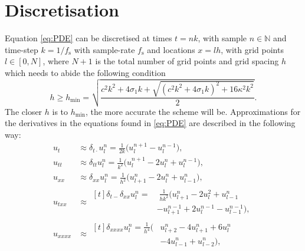 \documentclass[twoside,a4paper]{article}
\begin{document}
\section{Discretisation}\label{sec:discretisation}
Equation \eqref{eq:PDE} can be discretised at times $t = nk$, with sample $n \in \mathbb{N}$ and time-step $k = 1 / f_\text{s}$ with sample-rate $f_\text{s}$ and locations $x = lh$, with grid points $l \in [0,N]$, where $N + 1$ is the total number of grid points and grid spacing $h$ which needs to abide the following condition 
\begin{equation}
    h \geq h_\text{min} = \sqrt{\frac{c^2k^2+4 \sigma_1k+\sqrt{(c^2k^2+4\sigma_1k)^2+16\kappa^2k^2}}{2}}.
\end{equation}
The closer $h$ is to $h_\text{min}$, the more accurate the scheme will be. 
Approximations for the derivatives in the equations found in \ref{eq:PDE} are described in the following way: 
\begin{subequations}\label{eq:approximations}
    \begin{align}
        \label{eq:centerTime}
        u_{t} &\approx \delta_{t\cdot} u^n_l = \frac{1}{2k}\big(u_l^{n+1}-u_l^{n-1}\big),\\
        \label{eq:secondTime}
        u_{tt} &\approx \delta_{tt}u_l^n = \frac{1}{k^2} \big(u_l^{n+1} - 2u_l^n + u_l^{n-1}\big),\\
        \label{eq:secondSpacex}
        u_{xx} &\approx \delta_{xx}u_l^n = \frac{1}{h^2}\big(u_{l+1}^n - 2u_l^n + u_{l-1}^n\big),\\
        u_{txx} &\approx 
        \begin{aligned}[t]\delta_{t-}\delta_{xx}u_l^n =& \; \frac{1}{hk^2}\big(u_{l+1}^n - 2u_l^2 + u_{l-1}^n \\
        &- u_{l+1}^{n-1} + 2u_l^{n-1} - u_{l-1}^{n-1}\big),
        \end{aligned}\\
        \label{eq:fourthSpacex}
        u_{xxxx} &\approx\begin{aligned}[t] \delta_{xxxx}u_l^n = \frac{1}{h^4}\big(&u_{l+2}^n - 4u_{l+1}^n + 6u_l^n \\
        &- 4u_{l-1}^n +u_{l-2}^n\big),
        \end{aligned}
    \end{align}
\end{subequations}
\end{document}
